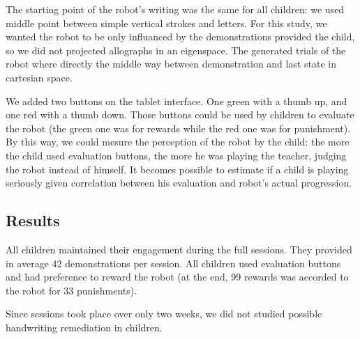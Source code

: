 \documentclass{sig-alternate}
\begin{document}
The starting point of the robot's writing was the same for all children: we
used middle point between simple vertical strokes and letters. For this study,
we wanted the robot to be only influanced by the demonstrations provided the
child, so we did not projected allographs in an eigenspace. The generated
trials of the robot where directly the middle way between demonstration and
last state in cartesian space. 

We added two buttons on the tablet  interface. One green with a thumb up, and
one red with a thumb down. Those buttons could be used by children to evaluate the
robot (the green one was for rewards while the red one was for punishment). By
this way, we could mesure the perception of
the robot by the child: the more the child used evaluation buttons, the more he
was playing the teacher, judging the robot instead of himself. It becomes
possible to estimate if a child is playing seriously given correlation between
his evaluation and robot's actual progression.


\subsection{Results}

All children maintained their engagement during the full sessions. They provided
in average 42 demonstrations per session. All children used evaluation buttons and
had preference to reward the robot (at the end, 99 rewards was accorded to the
robot for 33 punishments). 

Since sessions took place over only two weeks, we did not studied possible
handwriting remediation in children. 
\end{document}
